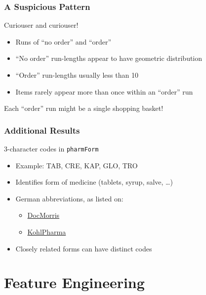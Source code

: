\documentclass{beamer}
\begin{document}
\begin{frame}
  \frametitle{A Suspicious Pattern}

  \begin{block}{Curiouser and curiouser!}
    \begin{itemize}
    \item Runs of ``no order'' and ``order''
    \item ``No order'' run-lengths appear to have geometric distribution
    \item ``Order'' run-lengths usually less than 10
    \item Items rarely appear more than once within an ``order'' run
    \end{itemize}
  \end{block}

  \pause
  Each ``order'' run might be a single shopping basket!

\end{frame}

\begin{frame}
  \frametitle{Additional Results}
  
  \begin{block}{3-character codes in \texttt{pharmForm}}
  \begin{itemize}
    \item Example: TAB, CRE, KAP, GLO, TRO
    \item Identifies form of medicine (tablets, syrup, salve, \dots)
    \item German abbreviations, as listed on:

    \begin{itemize}
      \item \href{http://www.docmorris-blog.de/2014/8/2/medikamente-abkuerzungsverzeichnis/}{DocMorris}
      \item \href{http://www.kohlpharma.com/de/import_arzneimittel/abkuerzungen}{KohlPharma}
    \end{itemize}

    \item Closely related forms can have distinct codes
  \end{itemize}
  \end{block}
\end{frame}


\section{Feature Engineering} %
\end{document}
